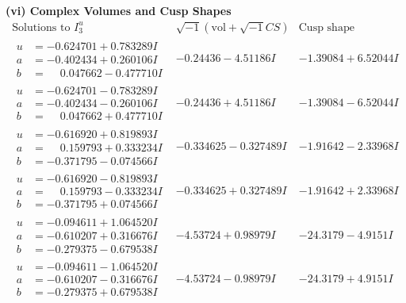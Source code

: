 \documentclass[1p]{elsarticle_modified}
\theoremstyle{definition}
\newcommand{\I}{\sqrt{-1}}
\begin{document}
\newpage\flushleft \textbf{(vi) Complex Volumes and Cusp Shapes}
$$\begin{array}{c|c|c}  
\text{Solutions to }I^u_{3}& \I (\text{vol} + \sqrt{-1}CS) & \text{Cusp shape}\\
 \hline 
\begin{aligned}
u &= -0.624701 + 0.783289 I \\
a &= -0.402434 + 0.260106 I \\
b &= \phantom{-}0.047662 - 0.477710 I\end{aligned}
 & -0.24436 - 4.51186 I & -1.39084 + 6.52044 I \\ \hline\begin{aligned}
u &= -0.624701 - 0.783289 I \\
a &= -0.402434 - 0.260106 I \\
b &= \phantom{-}0.047662 + 0.477710 I\end{aligned}
 & -0.24436 + 4.51186 I & -1.39084 - 6.52044 I \\ \hline\begin{aligned}
u &= -0.616920 + 0.819893 I \\
a &= \phantom{-}0.159793 + 0.333234 I \\
b &= -0.371795 - 0.074566 I\end{aligned}
 & -0.334625 - 0.327489 I & -1.91642 - 2.33968 I \\ \hline\begin{aligned}
u &= -0.616920 - 0.819893 I \\
a &= \phantom{-}0.159793 - 0.333234 I \\
b &= -0.371795 + 0.074566 I\end{aligned}
 & -0.334625 + 0.327489 I & -1.91642 + 2.33968 I \\ \hline\begin{aligned}
u &= -0.094611 + 1.064520 I \\
a &= -0.610207 + 0.316676 I \\
b &= -0.279375 - 0.679538 I\end{aligned}
 & -4.53724 + 0.98979 I & -24.3179 - 4.9151 I \\ \hline\begin{aligned}
u &= -0.094611 - 1.064520 I \\
a &= -0.610207 - 0.316676 I \\
b &= -0.279375 + 0.679538 I\end{aligned}
 & -4.53724 - 0.98979 I & -24.3179 + 4.9151 I \\ \hline\begin{aligned}

\end{aligned}
\end{array}$$
\end{document}
